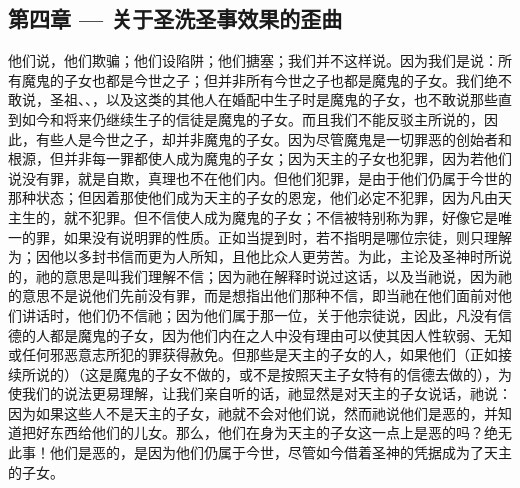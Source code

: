 
\subsection{第四章 — 关于圣洗圣事效果的歪曲}

他们说，他们欺骗；他们设陷阱；他们搪塞；我们并不这样说。因为我们是说：所有魔鬼的子女也都是今世之子；但并非所有今世之子也都是魔鬼的子女。我们绝不敢说，圣祖、、，以及这类的其他人在婚配中生子时是魔鬼的子女，也不敢说那些直到如今和将来仍继续生子的信徒是魔鬼的子女。而且我们不能反驳主所说的，因此，有些人是今世之子，却并非魔鬼的子女。因为尽管魔鬼是一切罪恶的创始者和根源，但并非每一罪都使人成为魔鬼的子女；因为天主的子女也犯罪，因为若他们说没有罪，就是自欺，真理也不在他们内。但他们犯罪，是由于他们仍属于今世的那种状态；但因着那使他们成为天主的子女的恩宠，他们必定不犯罪，因为凡由天主生的，就不犯罪。但不信使人成为魔鬼的子女；不信被特别称为罪，好像它是唯一的罪，如果没有说明罪的性质。正如当提到时，若不指明是哪位宗徒，则只理解为；因他以多封书信而更为人所知，且他比众人更劳苦。为此，主论及圣神时所说的，祂的意思是叫我们理解不信；因为祂在解释时说过这话，以及当祂说，因为祂的意思不是说他们先前没有罪，而是想指出他们那种不信，即当祂在他们面前对他们讲话时，他们仍不信祂；因为他们属于那一位，关于他宗徒说，因此，凡没有信德的人都是魔鬼的子女，因为他们内在之人中没有理由可以使其因人性软弱、无知或任何邪恶意志所犯的罪获得赦免。但那些是天主的子女的人，如果他们（正如接续所说的）（这是魔鬼的子女不做的，或不是按照天主子女特有的信德去做的），为使我们的说法更易理解，让我们亲自听的话，祂显然是对天主的子女说话，祂说：因为如果这些人不是天主的子女，祂就不会对他们说，然而祂说他们是恶的，并知道把好东西给他们的儿女。那么，他们在身为天主的子女这一点上是恶的吗？绝无此事！他们是恶的，是因为他们仍属于今世，尽管如今借着圣神的凭据成为了天主的子女。\par

